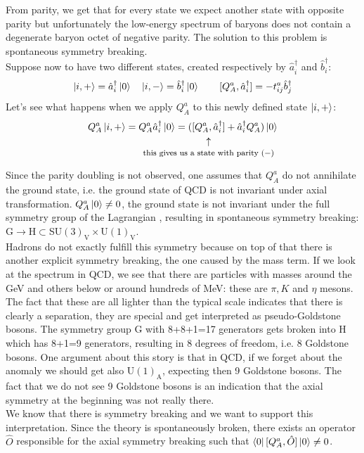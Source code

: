 \documentclass[../main.tex]{subfiles}
\begin{document}
From parity, we get that for every state we expect another state with opposite parity but unfortunately the low-energy spectrum of baryons does not contain a degenerate baryon octet of negative parity. The solution to this problem is spontaneous symmetry breaking.\\
Suppose now to have two different states, created respectively by $\hat{a}_i^\dagger$ and $\hat{b}_i^\dagger$:
\[
\ket{i,+}=\hat{a}_i^\dagger\ket{0} \quad \ket{i,-}=\hat{b}_i^\dagger\ket{0} \qquad [Q_A^a,\hat{a}_i^\dagger]=-t^a_{ij}\hat{b}_j^\dagger
\]
Let's see what happens when we apply $Q_A^a$ to this newly defined state $\ket{i,+}$:
\[
Q_A^a\ket{i,+}=Q_A^a\hat{a}_i^\dagger\ket{0}=(\underset{\mathclap{\tikz \node {$\uparrow$} node [below=1ex] {\footnotesize this gives us a state with parity $(-)$ };}}
{[Q_A^a,\hat{a}_i^\dagger]}+\hat{a}_i^\dagger Q_A^a)\ket{0}
\]
Since the parity doubling is not observed, one assumes that $Q_A^a$ do not annihilate the ground state, i.e. the ground state of QCD is not invariant under axial transformation. $Q_A^a\ket{0}\neq0$, the ground state is not invariant under the full symmetry group of the Lagrangian , resulting in spontaneous symmetry breaking: G$\to$H$\subset$SU$(3)_{\text{V}}\times$U$(1)_{\text{V}}$.\\
Hadrons do not exactly fulfill this symmetry because on top of that there is another explicit symmetry breaking, the one caused by the mass term. If we look at the spectrum in QCD, we see that there are particles with masses around the GeV and others below or around hundreds of MeV: these are $\pi, K$ and $\eta$ mesons. The fact that these are all lighter than the typical scale indicates that there is clearly a separation, they are special and get interpreted as pseudo-Goldstone bosons. The symmetry group G with 8+8+1=17 generators gets broken into H which has 8+1=9 generators, resulting in 8 degrees of freedom, i.e. 8 Goldstone bosons. One argument about this story is that in QCD, if we forget about the anomaly we should get also U$(1)_{\text{A}}$, expecting then 9 Goldstone bosons. The fact that we do not see 9 Goldstone bosons is an indication that the axial symmetry at the beginning was not really there.\\
We know that there is symmetry breaking and we want to support this interpretation. Since the theory is spontaneously broken, there exists an operator $\hat{O}$ responsible for the axial symmetry breaking such that $\bra{0}[Q_A^a,\hat{O}]\ket{0}\neq0$.\\
\end{document}
